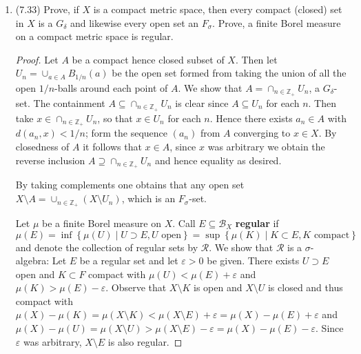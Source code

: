 \documentclass[11pt]{article}
\newcommand{\cbr}[1]{\left\{#1\right\}}
\begin{document}
\begin{enumerate}
\begin{proof}
        Observe that the complement $K = X\setminus U$ is a closed and hence compact (closed subsets of a compact space are compact) subset of $X$ with $\mu(K) = \mu(X\setminus U) = \mu(X) - \mu(U) = 1$ (since $\mu(X) = 1$). Every compact set is contained in $K$: Let $C$ be a compact and hence closed (compact sets are closed in Hausdorff spaces) set with unit measure. Then $\mu(X\setminus C) = \mu(X) - \mu(C) = 0$, so that $X\setminus C$ is a $\mu$-null open set. Hence $X\setminus C$ is contained in $U$, so that $C$ is contained in $K = X\setminus U$ as desired. Hence $K$ is the smallest compact subset of $X$ with unit measure; it is called the support of $\mu$.
    \end{proof}
    \item (7.33) Prove, if $X$ is a compact metric space, then every compact (closed)
    set in $X$ is a $G_\delta$ and likewise every open set an $F_\sigma$. Prove, a finite Borel measure on a compact metric space is regular. \begin{proof}
        Let $A$ be a compact hence closed subset of $X$. Then let $U_n = \cup_{a\in A}B_{1/n}(a)$ be the open set formed from taking the union of all the open $1/n$-balls around each point of $A$. We show that $A = \cap_{n\in \mathbb{Z}_+} U_n$, a $G_\delta$-set. The containment $A \subseteq \cap_{n\in \mathbb{Z}_+} U_n$ is clear since $A\subseteq U_n$ for each $n$. Then take $x\in \cap_{n\in \mathbb{Z}_+} U_n$, so that $x\in U_n$ for each $n$. Hence there exists $a_n\in A$ with $d(a_n,x)<1/n$; form the sequence $(a_n)$ from $A$ converging to $x\in X$. By closedness of $A$ it follows that $x\in A$, since $x$ was arbitrary we obtain the reverse inclusion $A \supseteq \cap_{n\in \mathbb{Z}_+} U_n$ and hence equality as desired.

        By taking complements one obtains that any open set $X\setminus A = \cup_{n\in \mathbb{Z}_+} (X\setminus U_n)$, which is an $F_\sigma$-set.

        Let $\mu$ be a finite Borel measure on $X$. Call $E\subseteq \mathscr{B}_X$ \textbf{regular} if $\mu(E) = \inf\cbr{\mu(U)\mid U\supset E, U\text{ open}} = \sup\cbr{\mu(K)\mid K\subset E, K\text{ compact}}$ and denote the collection of regular sets by $\mathcal{R}$. We show that $\mathcal{R}$ is a $\sigma$-algebra: Let $E$ be a regular set and let $\varepsilon>0$ be given. There exists $U\supset E$ open and $K\subset F$ compact with $\mu(U)<\mu(E) + \varepsilon$ and $\mu(K)>\mu(E)-\varepsilon$. Observe that $X\setminus K$ is open and $X\setminus U$ is closed and thus compact with $\mu(X)-\mu(K) = \mu(X\setminus K) < \mu(X\setminus E)+\varepsilon = \mu(X)-\mu(E)+\varepsilon $ and $\mu(X)-\mu(U) = \mu(X\setminus U) > \mu(X\setminus E)-\varepsilon = \mu(X)-\mu(E) - \varepsilon $. Since $\varepsilon$ was arbitrary, $X\setminus E$ is also regular. 


\end{proof}
\end{enumerate}
\end{document}
